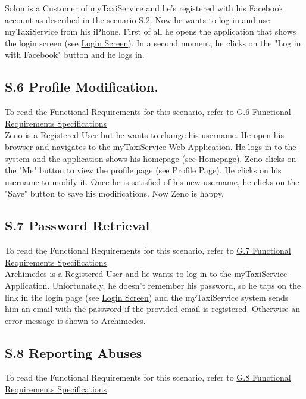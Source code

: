 		\label{sec:CustomerFacebookLoginScenario}
		Solon is a Customer of myTaxiService and he's registered with his Facebook account as described in the scenario \hyperref[sec:FacebookCustomerRegistrationScenario]{S.2}. Now he wants to log in and use myTaxiService from his iPhone.
		First of all he opens the application that shows the login screen (see \hyperref[login_m]{Login Screen}). In a second moment, he clicks on the "Log in with Facebook" button and he logs in.

		\subsection{S.6 Profile Modification.}\label{sec:RegisteredUserProfileModificationScenario}
		To read the Functional Requirements for this scenario, refer to \hyperref[sec:frs6]{G.6 Functional Requirements Specifications}\\

		Zeno is a Registered User but he wants to change his username. He open his browser and navigates to the myTaxiService Web Application. He logs in to the system and the application shows his homepage (see \hyperref[chome_m]{Homepage}). Zeno clicks on the "Me" button to view the profile page (see \hyperref[cpersonalPage_m]{Profile Page}). He clicks on his username to modify it. Once he is satisfied of his new username, he clicks on the "Save" button to save his modifications. Now Zeno is happy.

		\subsection{S.7 Password Retrieval}\label{sec:PasswordRetrievalScenario}
		To read the Functional Requirements for this scenario, refer to \hyperref[sec:frs7]{G.7 Functional Requirements Specifications}\\

		Archimedes is a Registered User and he wants to log in to the myTaxiService Application. Unfortunately, he doesn't remember his password, so he taps on the link in the login page (see \hyperref[login_m]{Login Screen}) and the myTaxiService system sends him an email with the password if the provided email is registered. Otherwise an error message is shown to Archimedes.

		\subsection{S.8 Reporting Abuses}\label{sec:ReportingAbusesScenario}
		To read the Functional Requirements for this scenario, refer to \hyperref[sec:frs8]{G.8 Functional Requirements Specifications}\\

